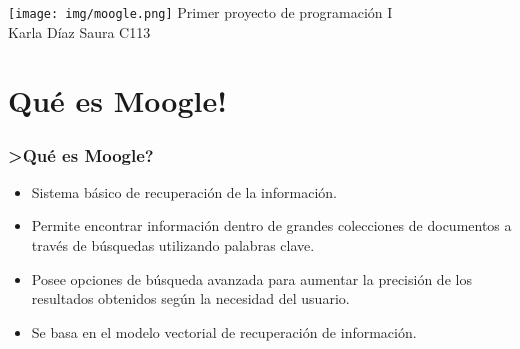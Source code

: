 \documentclass{beamer}
\begin{document}
\begin{frame}
    \centering
    \texttt{[image: img/moogle.png]}
    Primer proyecto de programaci\'on I\\\small Karla D\'iaz Saura C113
\end{frame}
\section*{Qu\'e es Moogle!}
\begin{frame}
    \frametitle{\textbf{>Qu\'e es Moogle?}}
    \begin{itemize}
        \item Sistema básico de recuperaci\'on de la informaci\'on.\pause
        \item Permite encontrar informaci\'on dentro de grandes colecciones de documentos a trav\'es de b\'usquedas utilizando palabras clave.\pause
        \item Posee opciones de b\'usqueda avanzada para aumentar la precisi\'on de los resultados obtenidos seg\'un la necesidad del usuario.\pause
        \item Se basa en el modelo vectorial de recuperaci\'on de informaci\'on.
    \end{itemize}
\end{frame}
\end{document}
